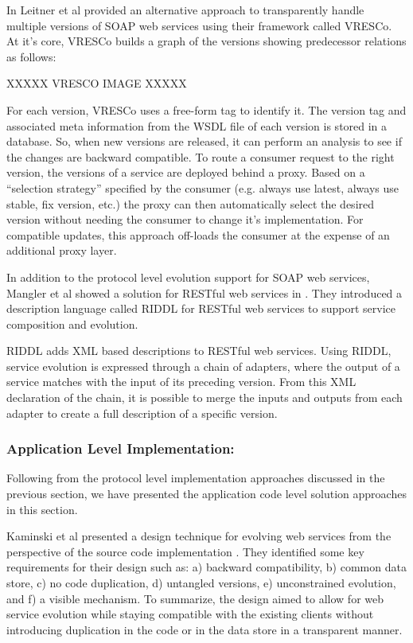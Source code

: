 \documentclass[runningheads,a4paper]{llncs}
\begin{document}
In \cite{leitner2008end} Leitner et al provided an alternative approach to transparently handle multiple versions of SOAP web services using their framework called VRESCo. At it’s core, VRESCo builds a graph of the versions showing predecessor relations as follows:

XXXXX VRESCO IMAGE XXXXX

For each version, VRESCo uses a free-form tag to identify it. The version tag and associated meta information from the WSDL file of each version is stored in a database. So, when new versions are released, it can perform an analysis to see if the changes are backward compatible. To route a consumer request to the right version, the versions of a service are deployed behind a proxy. Based on a ``selection strategy'' specified by the consumer (e.g. always use latest, always use stable, fix version, etc.) the proxy can then automatically select the desired version without needing the consumer to change it’s implementation. For compatible updates, this approach off-loads the consumer at the expense of an additional proxy layer.

In addition to the protocol level evolution support for SOAP web services, Mangler et al showed a solution for RESTful web services in \cite{mangler2010origin}. They introduced a description language called RIDDL for RESTful web services to support service composition and evolution.

RIDDL adds XML based descriptions to RESTful web services. Using RIDDL, service evolution is expressed through a chain of adapters, where the output of a service matches with the input of its preceding version. From this XML declaration of the chain, it is possible to merge the inputs and outputs from each adapter to create a full description of a specific version.

\subsubsection{Application Level Implementation:}

Following from the protocol level implementation approaches discussed in the previous section, we have presented the application code level solution approaches in this section.

Kaminski et al presented a design technique for evolving web services from the perspective of the source code implementation \cite{kaminski2006design}. They identified some key requirements for their design such as: a) backward compatibility, b) common data store, c) no code duplication, d) untangled versions, e) unconstrained evolution, and f) a visible mechanism. To summarize, the design aimed to allow for web service evolution while staying compatible with the existing clients without introducing duplication in the code or in the data store in a transparent manner.
\end{document}
